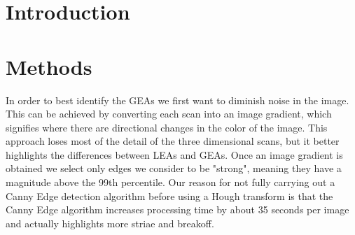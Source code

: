\documentclass[12pt]{article}
\theoremstyle{nonumberplain}
\begin{document}


\section{Introduction}

\section{Methods}


In order to best identify the GEAs we first want to diminish noise in the image. This can be achieved by converting each scan into an image gradient, which signifies where there are directional changes in the color of the image. This approach loses most of the detail of the three dimensional scans, but it better highlights the differences between LEAs and GEAs. Once an image gradient is obtained we select only edges we consider to be "strong", meaning they have a magnitude above the 99th percentile. Our reason for not fully carrying out a Canny Edge detection algorithm before using a Hough transform is that the Canny Edge algorithm increases processing time by about 35 seconds per image and actually highlights more striae and breakoff. 
\end{document}
